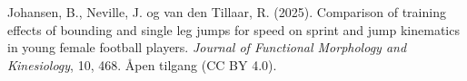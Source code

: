 \begin{referanser}

Johansen, B., Neville, J. og van den Tillaar, R. (2025). Comparison of training effects of bounding and single leg jumps for speed on sprint and jump kinematics in young female football players. \emph{Journal of Functional Morphology and Kinesiology}, 10, 468. Åpen tilgang (CC BY 4.0).

\end{referanser}
